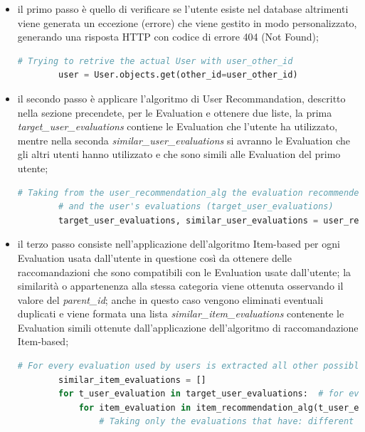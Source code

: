 \begin{itemize}
	\item il primo passo è quello di verificare se l'utente esiste nel database altrimenti viene generata un eccezione (errore) che viene gestito in
	modo personalizzato, generando una risposta HTTP con codice di errore 404 (Not Found);
	\begin{lstlisting}[language=Python, label=lst:CF_Hybrid_Evaluation_2]
		# Trying to retrive the actual User with user_other_id
		user = User.objects.get(other_id=user_other_id)
	\end{lstlisting} 
	\item il secondo passo è applicare l'algoritmo di User Recommandation, descritto nella sezione precendete, per le Evaluation e ottenere due liste,
	la prima \textit{target\_user\_evaluations} contiene le Evaluation che l'utente ha utilizzato, mentre nella seconda \textit{similar\_user\_evaluations}
	si avranno le Evaluation che gli altri utenti hanno utilizzato e che sono simili alle Evaluation del primo utente;
	\begin{lstlisting}[language=Python, label=lst:CF_Hybrid_Evaluation_3]
		# Taking from the user_recommendation_alg the evaluation recommended from this approach (similar_user_evaluations)
		# and the user's evaluations (target_user_evaluations)
		target_user_evaluations, similar_user_evaluations = user_recommendation_alg(user_other_id)
	\end{lstlisting} 
	\item il terzo passo consiste nell'applicazione dell'algoritmo Item-based per ogni Evaluation usata dall'utente in questione così da ottenere 
	delle raccomandazioni che sono compatibili con le Evaluation usate dall'utente; la similarità o appartenenza alla stessa categoria viene 
	ottenuta osservando il valore del \textit{parent\_id}; anche in questo caso vengono eliminati eventuali duplicati e viene formata una lista 
	\textit{similar\_item\_evaluations} contenente le Evaluation simili ottenute dall'applicazione dell'algoritmo di raccomandazione Item-based;
	\begin{lstlisting}[language=Python, label=lst:CF_Hybrid_Evaluation_4]
		# For every evaluation used by users is extracted all other possible evaluations that have the same 'parent_id'
		similar_item_evaluations = []
		for t_user_evaluation in target_user_evaluations:  # for every target user's evaluations
			for item_evaluation in item_recommendation_alg(t_user_evaluation['other_id']):  # is applied the item_recommendation algorithm
				# Taking only the evaluations that have: different other_id (excluding the target evaluation

\end{lstlisting}
\end{itemize}
